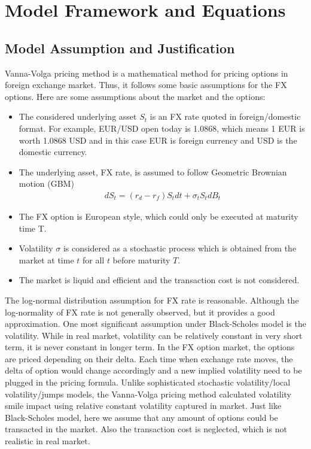 \section{Model Framework and Equations}
\subsection{Model Assumption and Justification} 
Vanna-Volga pricing method is a mathematical method for pricing options in foreign exchange market. Thus, it follows some basic assumptions for the FX options. Here are some assumptions about the market and the options:
\begin{itemize}
	\item The considered underlying asset $S_t$ is an FX rate quoted in foreign/domestic format. For example, EUR/USD open today is 1.0868, which means 1 EUR is worth 1.0868 USD and in this case EUR is foreign currency and USD is the domestic currency.
	\item The underlying asset, FX rate, is assumed to follow Geometric Brownian motion (GBM)
	\begin{align}
	dS_t = \left( r_d - r_f\right) S_tdt + \sigma_t S_t dB_t
	\end{align}  
	\item The FX option is European style, which could only be executed at maturity time T.
	\item Volatility $\sigma$ is considered as a stochastic process which is obtained from the market at time $t$ for all $t$ before maturity $T$. 
	\item The market is liquid and efficient and the transaction cost is not considered.
\end{itemize}
The log-normal distribution assumption for FX rate is reasonable. Although the log-normality of FX rate is not generally observed, but it provides a good approximation. 
\newline
\newline
One most significant assumption under Black-Scholes model is the volatility. While in real market, volatility can be relatively constant in very short term, it is never constant in longer term. In the FX option market, the options are priced depending on their delta. Each time when exchange rate moves, the delta of option would change accordingly and a new implied volatility need to be plugged in the pricing formula. Unlike sophisticated stochastic volatility/local volatility/jumps models, the Vanna-Volga pricing method calculated volatility smile impact using relative constant volatility captured in market. 
\newline
\newline
Just like Black-Scholes model, here we assume that any amount of options could be transacted in the market. Also the transaction cost is neglected, which is not realistic in real market.

